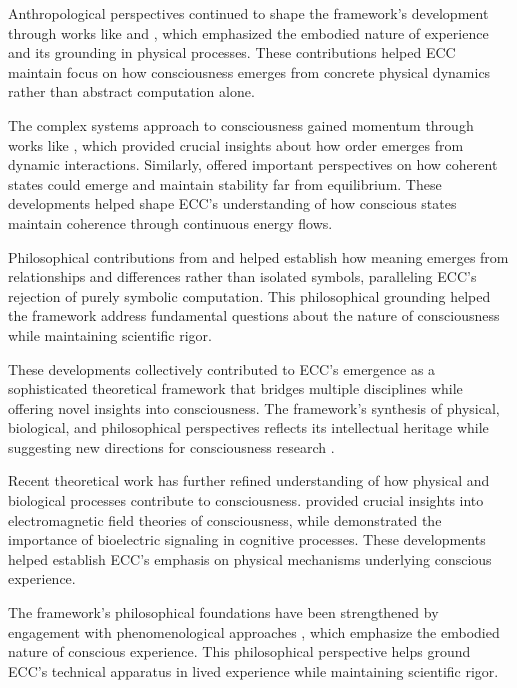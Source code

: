 \begin{refsection}
Anthropological perspectives continued to shape the framework's development through works like \cite{ingold2000perception} and \cite{desjarlais1992body}, which emphasized the embodied nature of experience and its grounding in physical processes. These contributions helped ECC maintain focus on how consciousness emerges from concrete physical dynamics rather than abstract computation alone.

The complex systems approach to consciousness gained momentum through works like \cite{kauffman1993origins}, which provided crucial insights about how order emerges from dynamic interactions. Similarly, \cite{prigogine1984order} offered important perspectives on how coherent states could emerge and maintain stability far from equilibrium. These developments helped shape ECC's understanding of how conscious states maintain coherence through continuous energy flows.

Philosophical contributions from \cite{levi-strauss1966savage} and \cite{bourdieu1977outline} helped establish how meaning emerges from relationships and differences rather than isolated symbols, paralleling ECC's rejection of purely symbolic computation. This philosophical grounding helped the framework address fundamental questions about the nature of consciousness while maintaining scientific rigor.

These developments collectively contributed to ECC's emergence as a sophisticated theoretical framework that bridges multiple disciplines while offering novel insights into consciousness. The framework's synthesis of physical, biological, and philosophical perspectives reflects its intellectual heritage while suggesting new directions for consciousness research \cite{adams1981foundations}.

Recent theoretical work has further refined understanding of how physical and biological processes contribute to consciousness. \cite{mcfadden2002cemi} provided crucial insights into electromagnetic field theories of consciousness, while \cite{levin2019computational} demonstrated the importance of bioelectric signaling in cognitive processes. These developments helped establish ECC's emphasis on physical mechanisms underlying conscious experience.

The framework's philosophical foundations have been strengthened by engagement with phenomenological approaches \cite{merleau-ponty1962phenomenology}, which emphasize the embodied nature of conscious experience. This philosophical perspective helps ground ECC's technical apparatus in lived experience while maintaining scientific rigor.


\end{refsection}
